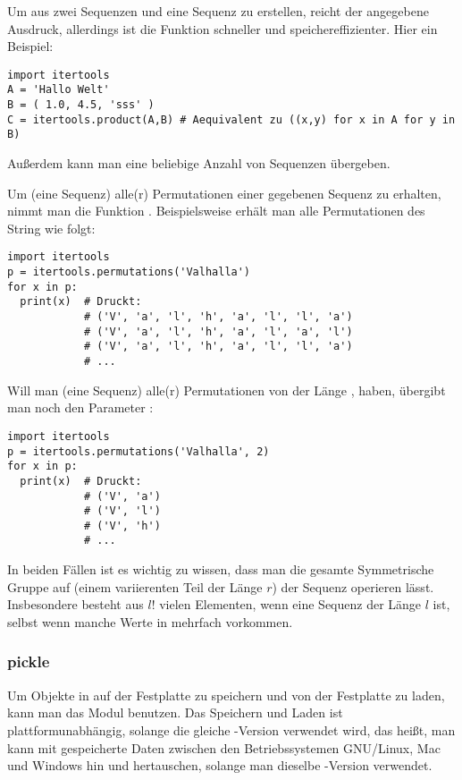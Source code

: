 Um aus zwei Sequenzen  und  eine Sequenz  zu erstellen, reicht der angegebene Ausdruck,
allerdings ist die Funktion  schneller und speichereffizienter.
Hier ein Beispiel:
\begin{lstlisting}
import itertools
A = 'Hallo Welt'
B = ( 1.0, 4.5, 'sss' )
C = itertools.product(A,B) # Aequivalent zu ((x,y) for x in A for y in B)
\end{lstlisting}
Außerdem kann man  eine beliebige Anzahl von Sequenzen übergeben.

Um (eine Sequenz) alle(r) Permutationen einer gegebenen Sequenz  zu erhalten, nimmt man die Funktion .
Beispielsweise erhält man alle Permutationen des String  wie folgt:
\begin{lstlisting}
import itertools
p = itertools.permutations('Valhalla')
for x in p:
  print(x)  # Druckt:
            # ('V', 'a', 'l', 'h', 'a', 'l', 'l', 'a')
            # ('V', 'a', 'l', 'h', 'a', 'l', 'a', 'l')
            # ('V', 'a', 'l', 'h', 'a', 'l', 'l', 'a')
            # ...
\end{lstlisting}
Will man (eine Sequenz) alle(r) Permutationen von  der Länge , haben, übergibt man  noch den Parameter :
\begin{lstlisting}
import itertools
p = itertools.permutations('Valhalla', 2)
for x in p:
  print(x)  # Druckt:
            # ('V', 'a')
            # ('V', 'l')
            # ('V', 'h')
            # ...
\end{lstlisting}
In beiden Fällen ist es wichtig zu wissen, dass man die gesamte Symmetrische Gruppe auf (einem variierenten Teil der Länge $r$) der Sequenz operieren lässt.
Insbesondere besteht  aus $l!$ vielen Elementen, wenn  eine Sequenz der Länge $l$ ist, selbst wenn manche Werte in  mehrfach vorkommen.


\subsubsection{pickle}
\label{section:module:empfohlene_module:pickle}
Um Objekte in \Python auf der Festplatte zu speichern und von der Festplatte zu laden, kann man das Modul  benutzen.
Das Speichern und Laden ist plattformunabhängig, solange die gleiche \Python-Version verwendet wird, das heißt,
man kann mit  gespeicherte Daten zwischen den Betriebssystemen GNU/Linux, Mac und Windows hin und hertauschen, solange man dieselbe \Python-Version verwendet.


